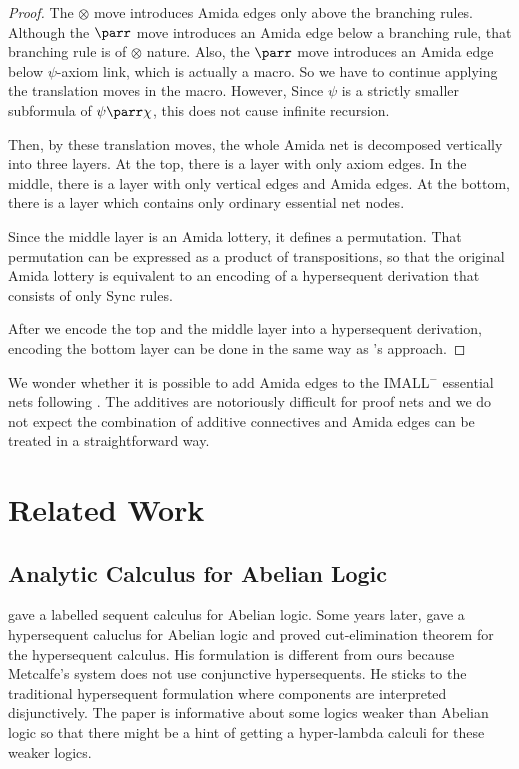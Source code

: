 \begin{proof}
The $\otimes$ move introduces Amida edges only above the branching rules.
Although the $\parr$ move introduces an Amida edge below a
branching rule, that branching rule is of $\otimes$ nature.
Also, the $\parr$ move introduces an Amida edge below $\psi$-axiom link,
which is actually a macro.  So we have to continue applying the
translation moves in the macro.  However, Since $\psi$ is a strictly
smaller subformula of $\psi\parr\chi$, this does not cause infinite
recursion.

Then, by these translation moves,
the whole Amida net is decomposed vertically into three layers.
At the top, there is a layer with only axiom edges.
In the middle, there is a layer with only vertical edges and Amida
edges.
At the bottom, there is a layer which contains only ordinary
essential net nodes.

Since the middle layer is an Amida lottery, it defines a permutation.
That permutation can be expressed as a product of transpositions, so
that
the original Amida lottery is equivalent to an encoding of a
  hypersequent derivation
that consists of only Sync rules.

After we encode the top and the middle layer into a hypersequent
derivation, encoding the bottom layer
can be done in the same way as \citet{lamarche2008}'s approach.
\end{proof}

We wonder whether it is possible to add Amida edges to
the IMALL$^-$ essential nets following
\citet{lamarche2008}.
The additives are notoriously difficult for proof nets and we do not
expect the combination of additive connectives and Amida edges can be
treated in a straightforward way.

\section{Related Work}

\subsection{Analytic Calculus for Abelian Logic}

\citet{metcalfe2002} gave a labelled sequent calculus for Abelian logic.
Some years later,
\citet{metcalfe2006} gave a hypersequent caluclus for Abelian logic and
proved cut-elimination theorem for the hypersequent calculus.
His formulation is different from ours because Metcalfe's system does
not use conjunctive hypersequents.  He sticks to the traditional
hypersequent formulation where components are interpreted disjunctively.
The paper \citep{metcalfe2006} is informative about some logics weaker
than Abelian logic so that there might be a hint of getting a
hyper-lambda calculi for these weaker logics.

